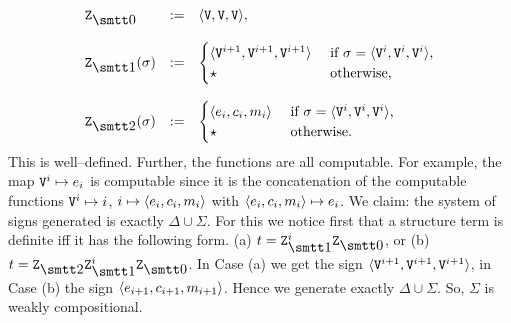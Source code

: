 \begin{equation}
\begin{array}{l@{\quad := \quad}l}
\mbox{\tt Z}_{\snull} & \auf \mbox{\tt V}, \mbox{\tt V}, \mbox{\tt V}\zu, \\
\multicolumn{2}{c}{} \\
\mbox{\tt Z}_{\seins}(\sigma) &
    \begin{cases}
    \auf \mbox{\tt V}^{i+1},
    \mbox{\tt V}^{i+1}, \mbox{\tt V}^{i+1}\zu &
        \text{ if $\sigma = \auf \mbox{\tt V}^i,
        \mbox{\tt V}^i, \mbox{\tt V}^i\zu$,} \\
    \star & \text{ otherwise,}
    \end{cases} \\
\multicolumn{2}{c}{} \\
\mbox{\tt Z}_{\szwei}(\sigma) &
    \begin{cases}
    \auf e_i, c_i, m_i\zu & \text{ if 
    $\sigma = \auf \text{\tt V}^i, \mbox{\tt V}^i, \mbox{\tt V}^i\zu$,} \\
    \star & \mbox{ otherwise.}
    \end{cases}
\end{array}
\end{equation}
This is well--defined. Further, the functions are all computable.
For example, the map $\mbox{\tt V}^i \mapsto e_i$ is computable
since it is the concatenation of the computable functions
$\mbox{\tt V}^i \mapsto i$, $i \mapsto \langle e_i, c_i,
m_i\rangle$ with $\langle e_i, c_i, m_i\rangle \mapsto e_i$. We claim:
the system of signs generated is exactly $\Delta \cup \Sigma$.
For this we notice first that a structure term is definite iff
it has the following form.
(a) $t = \mbox{\tt Z}_{\seins}^i\mbox{\tt Z}_{\snull}$, or
(b) $t = \mbox{\tt Z}_{\szwei}\mbox{\tt Z}_{\seins}^i\mbox{\tt Z}_{\snull}$.
In Case (a) we get the sign $\langle \mbox{\tt V}^{i+1},
\mbox{\tt V}^{i+1}, \mbox{\tt V}^{i+1}\rangle$, in Case
(b) the sign $\langle e_{i+1}, c_{i+1}, m_{i+1}\rangle$.
Hence we generate exactly $\Delta \cup \Sigma$. So,
$\Sigma$ is weakly compositional.
\proofend

